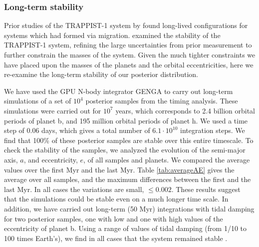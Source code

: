 \documentclass[twocolumn]{aastex63}
\begin{document}
\subsubsection{Long-term stability}

Prior studies of the TRAPPIST-1 system by
\citet{Tamayo2017} found long-lived configurations for
systems which had formed via migration.  \citet{Quarles2017} examined the stability
of the TRAPPIST-1 system,  refining the large uncertainties from prior
measurement \citep{Gillon2017} to further constrain the masses of
the system.  Given the much tighter constraints we have placed upon
the masses of the planets and the orbital eccentricities, here we
re-examine the long-term stability of our posterior distribution.

We have used the GPU N-body integrator GENGA \citep{Grimm2014} to carry out long-term simulations of a set of $10^4$ posterior samples from the timing analysis.  These simulations were carried out for $10^7$ years, which corresponds to 2.4 billion orbital periods of planet b, and 195 million orbital periods of planet h. We used a time step of 0.06 days, which gives a total number of $6.1 \cdot 10^{10}$ integration steps. We find that 100\% of these posterior samples are stable over this entire timescale. %
To check the stability of the samples, we analyzed the evolution of the semi-major axis, $a$, and eccentricity, $e$, of all samples and planets. We compared the average values over the first Myr and the last Myr. Table \ref{tab:averageAE} gives the average over all samples, and the maximum differences between the first and the last Myr.  In all cases the variations are small, ${\le}0.002$.  These results suggest that the simulations could be stable even on a much longer time scale. In addition, we have carried out long-term (50 Myr) integrations with tidal damping for two posterior samples, one with low and one with high values of the eccentricity of planet b. Using a range of values of tidal damping (from 1/10 to 100 times Earth's), we find in all cases that the system remained stable \citep[using Posidonius;][]{Bolmont2020}.
\end{document}
